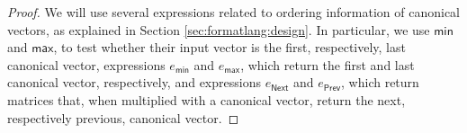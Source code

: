 \begin{proof}
    We will use several expressions related to ordering information of canonical vectors, as explained in Section \ref{sec:formatlang:design}.
	In particular, we use $\mathsf{min}$ and $\mathsf{max}$, to test whether their input vector is the first, respectively, last canonical
	vector, expressions $e_{\mathsf{min}}$ and $e_{\mathsf{max}}$, which return the first and last canonical vector, respectively, and expressions $e_{\mathsf{Next}}$
	and $e_{\mathsf{Prev}}$, which return matrices that, when multiplied with a canonical vector, return the next, respectively previous, canonical vector.

\end{proof}
